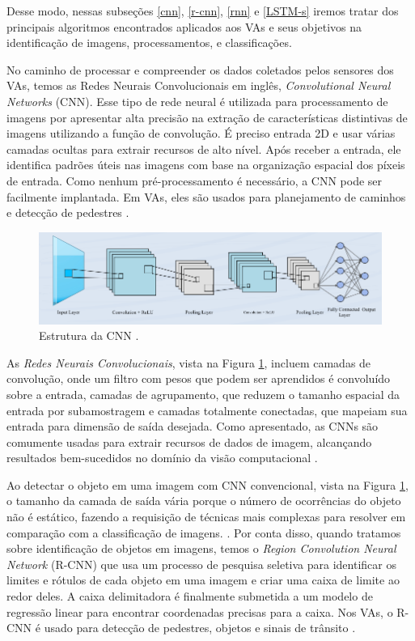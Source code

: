 Desse modo, nessas subseções \ref{cnn}, \ref{r-cnn}, \ref{rnn} e \ref{LSTM-s} iremos tratar dos principais algoritmos encontrados aplicados aos VAs e seus objetivos na identificação de imagens, processamentos, e classificações.

 \label{cnn}

No caminho de processar e compreender os dados coletados pelos sensores dos VAs, temos as Redes Neurais Convolucionais em inglês, \textit{Convolutional Neural Networks} (CNN). Esse tipo de rede neural é utilizada para processamento de imagens por apresentar alta precisão na extração de características distintivas de imagens utilizando a função de convolução. É preciso entrada 2D e usar várias camadas ocultas para extrair recursos de alto nível. Após receber a entrada, ele identifica padrões úteis nas imagens com base na organização espacial dos píxeis de entrada. Como nenhum pré-processamento é necessário, a CNN pode ser facilmente implantada. Em VAs, eles são usados para planejamento de caminhos e detecção de pedestres \cite{review-auto}.

\begin{figure}[H]
\centering
\includegraphics[width=\textwidth]{Figures/CNN.png}
\caption{Estrutura da CNN \cite{software-cnn}.}
\label{CNN}
\end{figure}

As \textit{Redes Neurais Convolucionais}, vista na Figura \ref{CNN}, incluem camadas de convolução, onde um filtro com pesos que podem ser aprendidos é convoluído sobre a entrada, camadas de agrupamento, que reduzem o tamanho espacial da entrada por subamostragem e camadas totalmente conectadas, que mapeiam sua entrada para dimensão de saída desejada. Como apresentado, as CNNs são comumente usadas para extrair recursos de dados de imagem, alcançando resultados bem-sucedidos no domínio da visão computacional \cite{software-review}.

 \label{r-cnn}

Ao detectar o objeto em uma imagem com CNN convencional, vista na Figura \ref{CNN}, o tamanho da camada de saída vária porque o número de ocorrências do objeto não é estático, fazendo a requisição de técnicas mais complexas para resolver em comparação com a classificação de imagens. \cite{software-cnn}.
Por conta disso, quando tratamos sobre identificação de objetos em imagens, temos o \textit{Region Convolution Neural Network} (R-CNN) que usa um processo de pesquisa seletiva para identificar os limites e rótulos de cada objeto em uma imagem e criar uma caixa de limite ao redor deles. A caixa delimitadora é finalmente submetida a um modelo de regressão linear para encontrar coordenadas precisas para a caixa. Nos VAs, o R-CNN é usado para detecção de pedestres, objetos e sinais de trânsito \cite{review-auto}.



